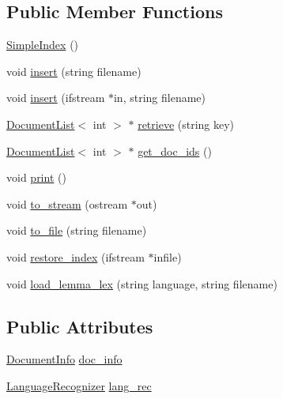 \subsection*{Public Member Functions}
\begin{DoxyCompactItemize}
\item 
\hyperlink{class_simple_index_a568167e1f7b626c221e2af34382fde08}{Simple\-Index} ()
\item 
void \hyperlink{class_simple_index_a3543f459591b58d8bbc66bbea185f56a}{insert} (string filename)
\item 
void \hyperlink{class_simple_index_ac4dd08c90e6d0301e9c904103404438a}{insert} (ifstream $\ast$in, string filename)
\item 
\hyperlink{class_document_list}{Document\-List}$<$ int $>$ $\ast$ \hyperlink{class_simple_index_a7e05f794bbfadad54b0207b2c3ad1de1}{retrieve} (string key)
\item 
\hyperlink{class_document_list}{Document\-List}$<$ int $>$ $\ast$ \hyperlink{class_simple_index_ab2be82d650d6a46133c69f8ba75f3b64}{get\-\_\-doc\-\_\-ids} ()
\item 
void \hyperlink{class_simple_index_a493941cf4eb8f3d149a5a521eb7fe3dd}{print} ()
\item 
void \hyperlink{class_simple_index_a31fa43913eed477552159b134a328463}{to\-\_\-stream} (ostream $\ast$out)
\item 
void \hyperlink{class_simple_index_a2c0c087962efbf6b4cb9d38d1043d074}{to\-\_\-file} (string filename)
\item 
void \hyperlink{class_simple_index_a553b9446f1164b1bd72f4196d864153a}{restore\-\_\-index} (ifstream $\ast$infile)
\item 
void \hyperlink{class_simple_index_af6fae809369d2ae265f60c4a678e0a31}{load\-\_\-lemma\-\_\-lex} (string language, string filename)
\end{DoxyCompactItemize}
\subsection*{Public Attributes}
\begin{DoxyCompactItemize}
\item 
\hyperlink{class_document_info}{Document\-Info} \hyperlink{class_simple_index_a7d3e80897ed6c69cdd4d61297cde527a}{doc\-\_\-info}
\item 
\hyperlink{class_language_recognizer}{Language\-Recognizer} \hyperlink{class_simple_index_aac925e5941373e3a2d711b3282618790}{lang\-\_\-rec}
\end{DoxyCompactItemize}
